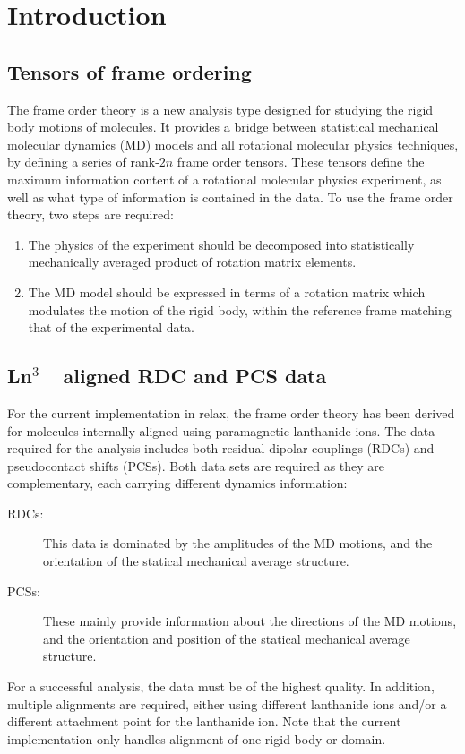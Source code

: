 
\section{Introduction}




\subsection{Tensors of frame ordering}

The frame order theory is a new analysis type designed for studying the rigid body motions of molecules.
It provides a bridge between statistical mechanical molecular dynamics (MD) models and all rotational molecular physics techniques, by defining a series of rank-$2n$ frame order tensors.
These tensors define the maximum information content of a rotational molecular physics experiment, as well as what type of information is contained in the data.
To use the frame order theory, two steps are required:
\begin{enumerate}
\item The physics of the experiment should be decomposed into statistically mechanically averaged product of rotation matrix elements.
\item The MD model should be expressed in terms of a rotation matrix which modulates the motion of the rigid body, within the reference frame matching that of the experimental data.
\end{enumerate}





\subsection{Ln$^{3+}$ aligned RDC and PCS data}

For the current implementation in relax, the frame order theory has been derived for molecules internally aligned using paramagnetic lanthanide ions.
The data required for the analysis includes both residual dipolar couplings (RDCs) and pseudocontact shifts (PCSs).
Both data sets are required as they are complementary, each carrying different dynamics information:
\begin{description}
\item[RDCs:]  This data is dominated by the amplitudes of the MD motions, and the orientation of the statical mechanical average structure.
\item[PCSs:]  These mainly provide information about the directions of the MD motions, and the orientation and position of the statical mechanical average structure.
\end{description}

For a successful analysis, the data must be of the highest quality.
In addition, multiple alignments are required, either using different lanthanide ions and/or a different attachment point for the lanthanide ion.
Note that the current implementation only handles alignment of one rigid body or domain.

